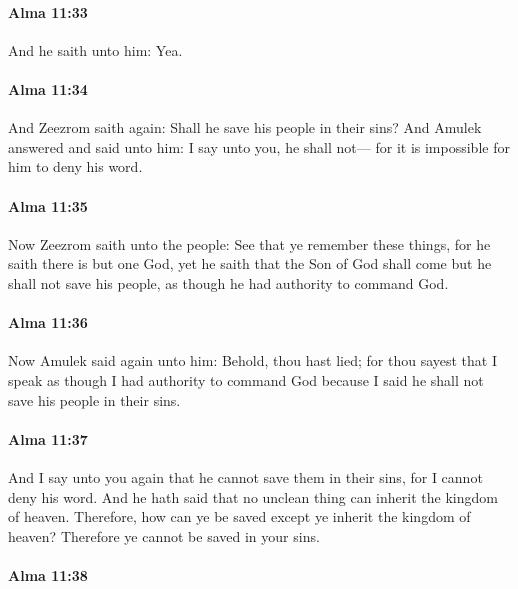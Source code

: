 		\paragraph{Alma 11:33} %
			\label{ALMA-11-33}

			And he saith unto him: Yea.

		\paragraph{Alma 11:34} %
			\label{ALMA-11-34}

			And Zeezrom saith again:
			Shall he save his people in their sins?
			And Amulek answered and said unto him:
			I say unto you, he shall not---
			for it is impossible for him to deny his word.

		\paragraph{Alma 11:35} %
			\label{ALMA-11-35}

			Now Zeezrom saith unto the people:
			See that ye remember these things,
			for he saith there is but one God,
			yet he saith that the Son of God shall come
			but he shall not save his people,
			as though he had authority to command God.

		\paragraph{Alma 11:36} %
			\label{ALMA-11-36}

			Now Amulek said again unto him:
			Behold, thou hast lied;
			for thou sayest that I speak as though I had authority to command God
			because I said he shall not save his people in their sins.

		\paragraph{Alma 11:37} %
			\label{ALMA-11-37}

			And I say unto you again
			that he cannot save them in their sins,
			for I cannot deny his word.
			And he hath said that no unclean thing can inherit the kingdom of heaven.
			Therefore, how can ye be saved except ye inherit the kingdom of heaven?
			Therefore ye cannot be saved in your sins.

		\paragraph{Alma 11:38} %
			\label{ALMA-11-38}

